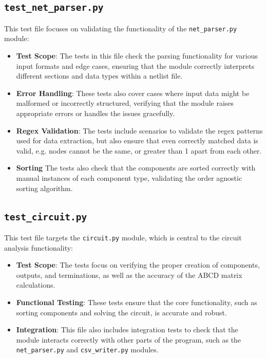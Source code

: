 \documentclass[conference]{IEEEtran}
\begin{document}
\subsection{\textbf{\texttt{test\_net\_parser.py}}}
This test file focuses on validating the functionality of the \texttt{net\_parser.py} module:
\begin{itemize}
      \item \textbf{Test Scope}: The tests in this file check the parsing functionality for various input formats and edge cases, ensuring that the module correctly interprets different sections and data types within a netlist file.
      \item \textbf{Error Handling}: These tests also cover cases where input data might be malformed or incorrectly structured, verifying that the module raises appropriate errors or handles the issues gracefully.
      \item \textbf{Regex Validation}: The tests include scenarios to validate the regex patterns used for data extraction, but also ensure that even correctly matched data is valid, e.g. nodes cannot be the same, or greater than
            1 apart from each other.
      \item \textbf{Sorting} The tests also check that the components are sorted correctly with manual instances of each component type, validating the order agnostic sorting algorithm.
\end{itemize}

\subsection{\textbf{\texttt{test\_circuit.py}}}
This test file targets the \texttt{circuit.py} module, which is central to the circuit analysis functionality:
\begin{itemize}
      \item \textbf{Test Scope}: The tests focus on verifying the proper creation of components, outputs, and terminations, as well as the accuracy of the ABCD matrix calculations.
      \item \textbf{Functional Testing}: These tests ensure that the core functionality, such as sorting components and solving the circuit, is accurate and robust.
      \item \textbf{Integration}: This file also includes integration tests to check that the module interacts correctly with other parts of the program, such as the \texttt{net\_parser.py} and \texttt{csv\_writer.py} modules.
\end{itemize}
\end{document}
